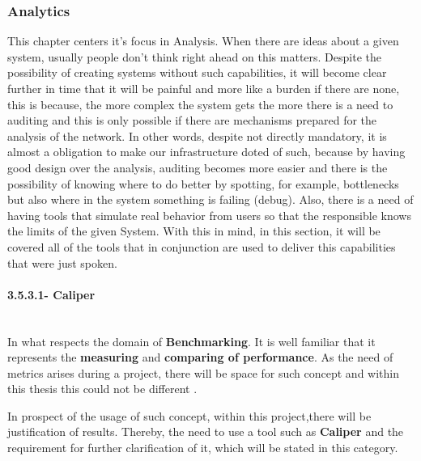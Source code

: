 \subsubsection{Analytics}
This chapter centers it's focus in Analysis. When there are ideas about a given system, usually people don't think right ahead on this 
matters. Despite the possibility of creating systems without such capabilities, it will become clear further in time that it will be 
painful and more like a burden if there are none, this is because, the more complex the system gets the more there is a need to auditing 
and this is only possible if there are mechanisms prepared for the analysis of the network. In other words, despite not directly mandatory,
it is almost a obligation to make our infrastructure doted of such, because by having good design over the analysis, auditing becomes 
more easier and there is the possibility of knowing where to do better by spotting, for example, bottlenecks but also where in the system 
something is failing (debug). Also, there is a need of having tools that simulate real behavior from users so that the responsible knows 
the limits of the given System. With this in mind, in this section, it will be covered all of the tools that in conjunction are used to 
deliver this capabilities that were just spoken.

\paragraph{3.5.3.1- Caliper}\mbox{}\\
In what respects the domain of \textbf{Benchmarking}. It is well familiar that it represents the 
\textbf{measuring} and \textbf{comparing of performance}. As the need of metrics arises during a project, there will be space 
for such concept and within this thesis this could not be different \cite{caliper}.

In prospect of the usage of such concept, within this project,there will be justification of results. Thereby, the need to use a tool 
such as \textbf{Caliper} and the requirement for further clarification of it, which will be stated in this category.

